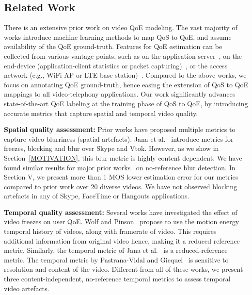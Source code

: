 \subsection{Related Work}
There is an extensive prior work on video QoE modeling. The vast majority of works \cite{aggarwal2014prometheus,balachandran2013developing,fiedler2010generic} introduce machine learning methods to map QoS to QoE, and assume availability of the QoE ground-truth. Features for QoE estimation can be collected from various vantage points, such as on the application server~\cite{balachandran2013developing}, on the end-device (application-client statistics or packet capturing)~\cite{zhang2012profiling,yu2014can,seufert2015survey,aggarwal2014prometheus,balachandran2012quest,chen2014qoe}, or the access network (e.g., WiFi AP or LTE base station)~\cite{chakraborty2016exbox,jana2016qoe,chen2006quantifying}. Compared to the above works, we focus on annotating QoE ground-truth, hence easing the extension of QoS to QoE mappings to all video-telephony applications. Our work significantly advances state-of-the-art QoE labeling at the training phase of QoS to QoE, by introducing accurate metrics that capture spatial and temporal video quality.

\noindent
\textbf{Spatial quality assessment:}  Prior works have proposed multiple metrics to capture video blurriness (spatial artefacts). Jana et al.~\cite{jana2016qoe} introduce metrics for freezes, blocking and blur over Skype and Vtok. However, as we show in Section~\ref{MOTIVATION}, this blur metric is highly content dependent. We have found similar results for major prior works~\cite{golestaneh2014no, mittal2012no,tong2004blur,marziliano2002no} on no-reference blur detection. In Section V, we present more than 1 MOS lower estimation error for our metrics compared to prior work over 20 diverse videos. We have not observed blocking artefacts in any of Skype, FaceTime or Hangouts applications.

\noindent
\textbf{Temporal quality assessment:} Several works \cite{wolf2009no, borer2010model, usman2017no, pastrana2006automatic} have investigated the effect of video freezes on user QoE. Wolf and Pinson~\cite{wolf2009no} propose to use the motion energy temporal history of videos, along with framerate of video. This requires additional information from original video hence, making it a reduced reference metric. Similarly, the temporal metric of Jana et al.~\cite{jana2016qoe} is a reduced-reference metric. The temporal metric by Pastrana-Vidal and Gicquel~\cite{pastrana2006automatic} is sensitive to resolution and content of the video. Different from all of these works, we present three content-independent, no-reference temporal metrics to assess temporal video artefacts.
